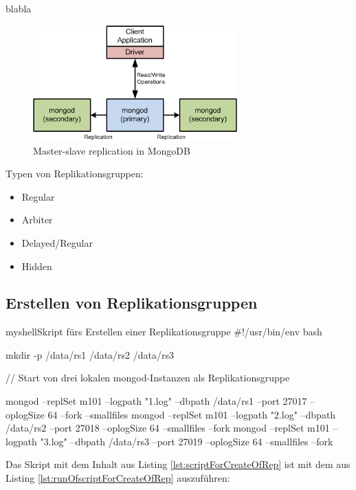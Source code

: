 blabla
\begin{figure}[H]
\centering
\includegraphics[width=0.7\textwidth]{resources/mongo_replication}
\caption[Master-slave replication in MongoDB]{Master-slave replication in MongoDB\protect\footnotemark}
\label{img:mongo_replication}
\end{figure}



Typen von Replikationsgruppen:
\begin{itemize}
\item Regular
\item Arbiter
\item Delayed/Regular
\item Hidden
\end{itemize}
\subsection{Erstellen von Replikationsgruppen}

\begin{listingsboxShell}[label={lst:scriptForCreateOfRep}]{myshell}{Skript fürs Erstellen einer Replikationsgruppe}
#!/usr/bin/env bash

mkdir -p /data/rs1 /data/rs2 /data/rs3

// Start von drei lokalen mongod-Instanzen als Replikationsgruppe

mongod --replSet m101 --logpath "1.log" --dbpath /data/rs1 --port 27017
--oplogSize 64 --fork --smallfiles
mongod --replSet m101 --logpath "2.log" --dbpath /data/rs2 --port 27018
--oplogSize 64 --smallfiles --fork
mongod --replSet m101 --logpath "3.log" --dbpath /data/rs3 --port 27019
--oplogSize 64 --smallfiles --fork
\end{listingsboxShell}

Das Skript mit dem Inhalt aus Listing \ref{lst:scriptForCreateOfRep} ist mit dem aus Listing \ref{lst:runOfscriptForCreateOfRep} auszuführen:

